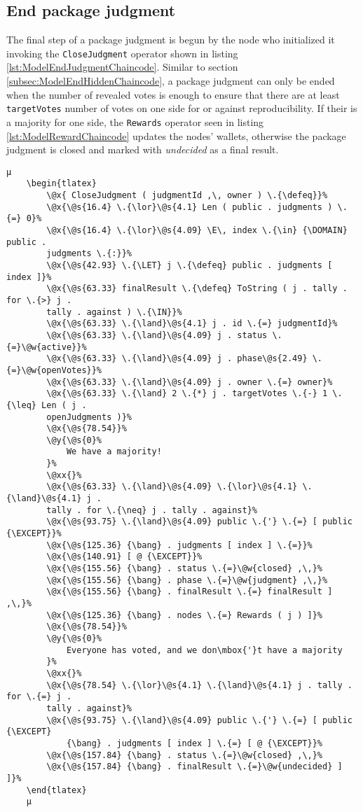 \subsection{End package judgment}
\label{subsec:ModelEndJudgmentChaincode}

The final step of a package judgment is begun by the node who initialized it invoking the \texttt{CloseJudgment} operator shown in listing \ref{lst:ModelEndJudgmentChaincode}. Similar to section \ref{subsec:ModelEndHiddenChaincode}, a package judgment can only be ended when the number of revealed votes is enough to ensure that there are at least \texttt{targetVotes} number of votes on one side for or against reproducibility. If their is a majority for one side, the \texttt{Rewards} operator seen in listing \ref{lst:ModelRewardChaincode} updates the nodes' wallets, otherwise the package judgment is closed and marked with \emph{undecided} as a final result.

\begin{lstlisting}[caption=Chaincode to end a package judgment, label=lst:ModelEndJudgmentChaincode]
	µ
	\begin{tlatex}
        \@x{ CloseJudgment ( judgmentId ,\, owner ) \.{\defeq}}%
        \@x{\@s{16.4} \.{\lor}\@s{4.1} Len ( public . judgments ) \.{=} 0}%
        \@x{\@s{16.4} \.{\lor}\@s{4.09} \E\, index \.{\in} {\DOMAIN} public .
        judgments \.{:}}%
        \@x{\@s{42.93} \.{\LET} j \.{\defeq} public . judgments [ index ]}%
        \@x{\@s{63.33} finalResult \.{\defeq} ToString ( j . tally . for \.{>} j .
        tally . against ) \.{\IN}}%
        \@x{\@s{63.33} \.{\land}\@s{4.1} j . id \.{=} judgmentId}%
        \@x{\@s{63.33} \.{\land}\@s{4.09} j . status \.{=}\@w{active}}%
        \@x{\@s{63.33} \.{\land}\@s{4.09} j . phase\@s{2.49} \.{=}\@w{openVotes}}%
        \@x{\@s{63.33} \.{\land}\@s{4.09} j . owner \.{=} owner}%
        \@x{\@s{63.33} \.{\land} 2 \.{*} j . targetVotes \.{-} 1 \.{\leq} Len ( j .
        openJudgments )}%
        \@x{\@s{78.54}}%
        \@y{\@s{0}%
            We have a majority!
        }%
        \@xx{}%
        \@x{\@s{63.33} \.{\land}\@s{4.09} \.{\lor}\@s{4.1} \.{\land}\@s{4.1} j .
        tally . for \.{\neq} j . tally . against}%
        \@x{\@s{93.75} \.{\land}\@s{4.09} public \.{'} \.{=} [ public {\EXCEPT}}%
        \@x{\@s{125.36} {\bang} . judgments [ index ] \.{=}}%
        \@x{\@s{140.91} [ @ {\EXCEPT}}%
        \@x{\@s{155.56} {\bang} . status \.{=}\@w{closed} ,\,}%
        \@x{\@s{155.56} {\bang} . phase \.{=}\@w{judgment} ,\,}%
        \@x{\@s{155.56} {\bang} . finalResult \.{=} finalResult ] ,\,}%
        \@x{\@s{125.36} {\bang} . nodes \.{=} Rewards ( j ) ]}%
        \@x{\@s{78.54}}%
        \@y{\@s{0}%
            Everyone has voted, and we don\mbox{'}t have a majority
        }%
        \@xx{}%
        \@x{\@s{78.54} \.{\lor}\@s{4.1} \.{\land}\@s{4.1} j . tally . for \.{=} j .
        tally . against}%
        \@x{\@s{93.75} \.{\land}\@s{4.09} public \.{'} \.{=} [ public {\EXCEPT}
            {\bang} . judgments [ index ] \.{=} [ @ {\EXCEPT}}%
        \@x{\@s{157.84} {\bang} . status \.{=}\@w{closed} ,\,}%
        \@x{\@s{157.84} {\bang} . finalResult \.{=}\@w{undecided} ] ]}%
    \end{tlatex}
    µ
\end{lstlisting}

